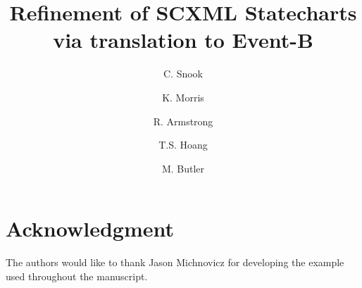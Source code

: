 \documentclass[runningheads,a4paper]{llncs}
\begin{document}
\mainmatter  %

\title{Refinement of SCXML Statecharts via translation to Event-B}


%
\author{C. Snook  %
\and K. Morris  
\and R. Armstrong 
\and T.S. Hoang 
\and M. Butler  
}




\maketitle

\resetabbrev



















\section*{Acknowledgment} The authors would like to thank Jason Michnovicz for developing the \IDS example used throughout the manuscript.
\end{document}
